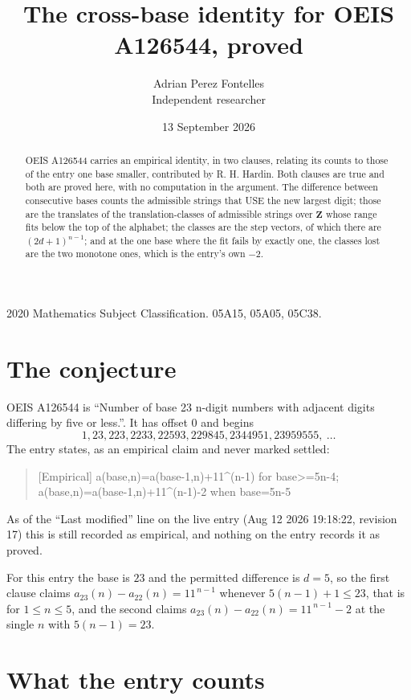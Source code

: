 \documentclass[11pt,a4paper]{article}
\title{The cross-base identity for OEIS A126544, proved}
\author{Adrian Perez Fontelles\\ \small Independent researcher}
\date{13 September 2026}
\theoremstyle{plain}
\theoremstyle{definition}
\begin{document}
\maketitle

\begin{abstract}
OEIS A126544 carries an empirical identity, in two clauses, relating its counts to those of the
entry one base smaller, contributed by R. H. Hardin. Both clauses are true and both are proved
here, with no computation in the argument. The difference between consecutive bases counts the
admissible strings that USE the new largest digit; those are the translates of the
translation-classes of admissible strings over $\mathbf{Z}$ whose range fits below the top of
the alphabet; the classes are the step vectors, of which there are $(2d+1)^{n-1}$; and at the
one base where the fit fails by exactly one, the classes lost are the two monotone ones, which
is the entry's own $-2$.
\end{abstract}

\noindent\small 2020 Mathematics Subject Classification. 05A15, 05A05, 05C38.\normalsize

\section{The conjecture}

OEIS A126544 is ``Number of base 23 n-digit numbers with adjacent digits differing by five or less.''. It has offset $0$ and begins
\[
1, 23, 223, 2233, 22593, 229845, 2344951, 23959555,\ \dots
\]
The entry states, as an empirical claim and never marked settled:
\begin{quote}
[Empirical] a(base,n)=a(base-1,n)+11\textasciicircum{}(n-1) for base>=5n-4; a(base,n)=a(base-1,n)+11\textasciicircum{}(n-1)-2 when base=5n-5
\end{quote}
As of the ``Last modified'' line on the live entry (Aug 12 2026 19:18:22, revision 17)
this is still recorded as empirical, and nothing on the entry records it as proved.

For this entry the base is $23$ and the permitted difference is $d=5$, so the first clause
claims $a_{23}(n)-a_{22}(n)=11^{\,n-1}$ whenever $5(n-1)+1\le23$, that is for
$1\le n\le5$, and the second claims $a_{23}(n)-a_{22}(n)=11^{\,n-1}-2$ at the single
$n$ with $5(n-1)=23$.

\section{What the entry counts}
\end{document}
